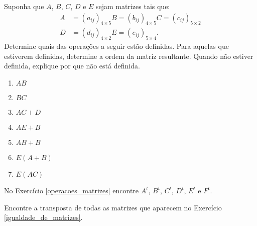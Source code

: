 \documentclass[12pt]{exam}
\begin{document}
\begin{exercicio}
    Suponha que $A$, $B$, $C$, $D$ e $E$ sejam matrizes tais que:
    \begin{align*}
        A &= (a_{ij})_{4 \times 5}
        B = (b_{ij})_{4 \times 5}
        C = (c_{ij})_{5 \times 2}\\
        D &= (d_{ij})_{4 \times 2}
        E = (e_{ij})_{5 \times 4}.
    \end{align*}
    Determine quais das operações a seguir estão definidas. Para aquelas que estiverem definidas, determine a ordem da matriz resultante. Quando não estiver definida, explique por que não está definida.
    \begin{multicols}{2}
        \begin{enumerate}[label={\alph*})]
            \item $AB$

            \item $BC$

            \item $AC + D$

            \item $AE + B$

            \item $AB + B$

            \item $E(A + B)$

            \item $E(AC)$

        \end{enumerate}
    \end{multicols}
\end{exercicio}

\begin{exercicio}
    No Exercício \ref{operacoes_matrizes} encontre $A^t$, $B^t$, $C^t$, $D^t$, $E^t$ e $F^t$.
\end{exercicio}

\begin{exercicio}
    Encontre a transposta de todas as matrizes que aparecem no Exercício \ref{igualdade_de_matrizes}.
\end{exercicio}
\end{document}
